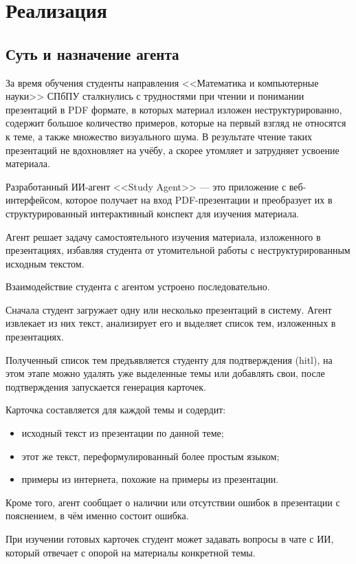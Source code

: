 \section{Реализация}

\subsection{Суть и назначение агента}

За время обучения студенты направления <<Математика и компьютерные науки>>
СПбПУ сталкнулись с трудностями при чтении и понимании презентаций в PDF формате, в которых
материал изложен неструктурированно, содержит большое
количество примеров, которые на первый взгляд не относятся к теме, а также множество
визуального шума. В результате чтение таких презентаций не вдохновляет на учёбу,
а скорее утомляет и затрудняет усвоение материала.

Разработанный ИИ-агент <<Study Agent>> --- это приложение с веб-интерфейсом,
которое получает на вход PDF-презентации и преобразует их
в структурированный интерактивный конспект для изучения материала.

Агент решает задачу самостоятельного изучения материала, изложенного в презентациях,
избавляя студента от утомительной работы с неструктурированным исходным текстом.

Взаимодействие студента с агентом устроено последовательно.

Сначала студент загружает одну или несколько презентаций в систему.
Агент извлекает из них текст, анализирует его и выделяет список тем,
изложенных в презентациях.

Полученный список тем предъявляется студенту для подтверждения
(hitl), на этом этапе можно удалять уже выделенные темы или добавлять свои,
после подтверждения запускается генерация карточек.

Карточка составляется для каждой темы и содердит:
\begin{itemize}
    \item исходный текст из презентации по данной теме;
    \item этот же текст, переформулированный более простым языком;
    \item примеры из интернета, похожие на примеры из презентации.
\end{itemize}
Кроме того, агент сообщает о наличии или отсутствии ошибок в презентации
с пояснением, в чём именно состоит ошибка.

При изучении готовых карточек студент может задавать вопросы в чате
с ИИ, который отвечает с опорой на материалы конкретной темы.

